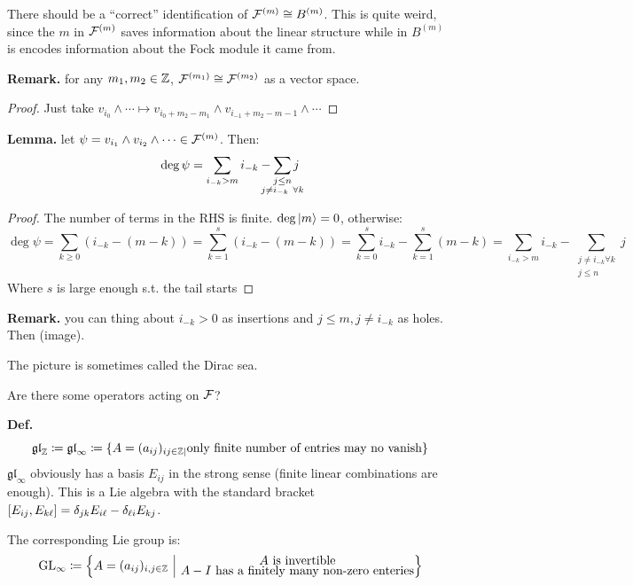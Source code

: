 \documentclass[]{../../../../tex/classes/styledArticle}
\newcommand\gl {\mathfrak{gl}}
\begin{document}
	There should be a ``correct'' identification of $\mathcal{F}^{(m)}\cong B^{(m)}$. This is quite weird, since the $m $ in $\mathcal{F}^{(m)}$ saves information about the linear structure while in $B^{(m)}$ is encodes information about the Fock module it came from. 
	
	\textbf{Remark. }for any $m_1, m_2 \in \mathbb{Z}$, $\mathcal{F}^{(m_1)} \cong \mathcal{F}^{(m_2)}$ as a vector space. \begin{proof}
		Just take $v_{i_0} \land \cdots \mapsto v_{i_0 + m_2 - m_1} \land v_{i_{-1} + m_2 - m-1} \land \cdots$
	\end{proof}
	
	\textbf{Lemma. }let $\psi = v_{i_1} \land v_{i_2} \land \cdots \in \mathcal{F}^{(m)}$. Then: 
	\[ \deg \psi = \sum_{i_{-k} > m} i_{-k} - \sum_{\mathclap{\substack{j \le n \\ j \neq i_{-k} \ \forall k}}} j \]
	\begin{proof}
		The number of terms in the RHS is finite. $\deg |m\rangle = 0$, otherwise: 
		\[ \deg \psi = \sum_{k \ge 0}(i_{-k} - (m - k)) = \sum_{k = 1}^{s}(i_{-k} - (m - k)) = \sum_{k = 0}^{s}i_{-k} - \sum_{k = 1}^{s}(m - k) = \sum_{i_{-k} >m}i_{-k} - \sum_{\substack{j \neq i_{-k} \forall k \\ j \le n}} j \]
		Where $s$ is large enough s.t. the tail starts
	\end{proof}
	
	\textbf{Remark. }you can thing about $i_{-k} > 0$ as insertions and $j \le m, j \neq i_{-k}$ as holes. Then (image). 
	
	The picture is sometimes called the Dirac sea. 
	
	Are there some operators acting on $\mathcal{F}$? 
	
	\textbf{Def. }
	\[ \gl_\Z \cod \gl_\infty \cod \{A = (a_{ij})_{ij \in \Z\mid} \text{only finite number of entries may no vanish}\} \]
	$\gl_\infty$ obviously has a basis $E_{ij}$ in the strong sense (finite linear combinations are enough). This is a Lie algebra with the standard bracket $[E_{ij}, E_{k\ell}] = \delta_{jk}E_{i\ell} - \delta_{\ell i}E_{kj}$. 
	
	The corresponding Lie group is: 
	\[ \mathrm{GL}_\infty \coloneqq \left \{ A = (a_{ij})_{i, j \in \mathbb{Z}} \ \middle\vert\  \substack{\text{\normalsize$A$ is invertible} \\ \text{\normalsize$A-I$ has a finitely many non-zero enteries}} \right \} \]
	
\end{document}
